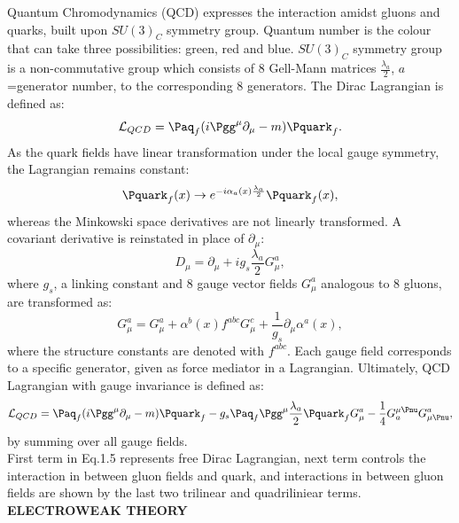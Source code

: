 Quantum Chromodynamics (QCD) expresses the interaction amidst gluons and quarks, built upon $SU(3)_C$ symmetry group. Quantum number is the colour that can take three possibilities: green, red and blue. $SU(3)_C$ symmetry group is a non-commutative group which consists of 8 Gell-Mann matrices $\frac{\lambda_a}{2}$, $a$=generator number, to the corresponding 8 generators. The Dirac Lagrangian is defined as:
\begin{equation}
    \mathcal{L}_{QCD}=\Paq_{f}(i\Pgg^{\mu}\partial_\mu-m)\Pquark_f.
\end{equation}
As the quark fields have linear transformation under the local gauge symmetry, the Lagrangian remains constant:
\begin{equation}
    \Pquark_f(x) \rightarrow e^{-i\alpha_a (x) \frac{\lambda_a}{2}} \Pquark_f (x),
\end{equation}
whereas the Minkowski space derivatives are not linearly transformed. A covariant derivative is reinstated in place of $\partial_\mu$:
\begin{equation}
    D_\mu=\partial_\mu + i g_s \frac{\lambda_a}{2}G^a_\mu,
\end{equation}
where $g_s$, a linking constant and 8 gauge vector fields $G^a_\mu$ analogous to 8 gluons, are transformed as:
\begin{equation}
    G^a_\mu=G^a_\mu + \alpha^b (x) f^{abc}G^c_\mu + \frac{1}{g_s} \partial_\mu \alpha^a (x),
\end{equation}
where the structure constants are denoted with $f^{abc}$. Each gauge field corresponds to a specific generator, given as force mediator in a Lagrangian. Ultimately, QCD Lagrangian with gauge invariance is defined as:
\begin{equation}
    \mathcal{L}_{QCD}=\Paq_{f}(i\Pgg^{\mu}\partial_\mu-m)\Pquark_f - g_s \Paq_f \Pgg^\mu \frac{\lambda_a}{2} \Pquark_f G^a_\mu - \frac{1}{4} G^{\mu\Pnu}_a G^a_{\mu\Pnu},
\end{equation}
by summing over all gauge fields.\\
First term in Eq.1.5 represents free Dirac Lagrangian, next term controls the interaction in between gluon fields and quark, and interactions in between gluon fields are shown by the last two trilinear and quadriliniear terms.\\

\textbf{ELECTROWEAK THEORY}\\

